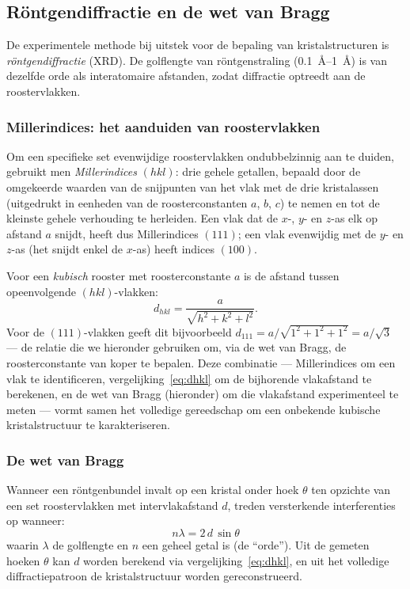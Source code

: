 \subsection{R\"ontgendiffractie en de wet van Bragg}
\label{sec:xrd}

De experimentele methode bij uitstek voor de bepaling van kristalstructuren is \emph{r\"ontgendiffractie} (XRD). De golflengte van r\"ontgenstraling (\SIrange{0.1}{1}{\angstrom}) is van dezelfde orde als interatomaire afstanden, zodat diffractie optreedt aan de roostervlakken.

\subsubsection{Millerindices: het aanduiden van roostervlakken}
\label{sec:miller}

Om een specifieke set evenwijdige roostervlakken ondubbelzinnig aan te duiden, gebruikt men \emph{Millerindices} $(hkl)$: drie gehele getallen, bepaald door de omgekeerde waarden van de snijpunten van het vlak met de drie kristalassen (uitgedrukt in eenheden van de roosterconstanten $a$, $b$, $c$) te nemen en tot de kleinste gehele verhouding te herleiden. Een vlak dat de $x$-, $y$- en $z$-as elk op afstand $a$ snijdt, heeft dus Millerindices $(111)$; een vlak evenwijdig met de $y$- en $z$-as (het snijdt enkel de $x$-as) heeft indices $(100)$.

Voor een \emph{kubisch} rooster met roosterconstante $a$ is de afstand tussen opeenvolgende $(hkl)$-vlakken:
\begin{equation}
\boxed{\;d_{hkl} = \frac{a}{\sqrt{h^2+k^2+l^2}}.\;}
\label{eq:dhkl}
\end{equation}
Voor de $(111)$-vlakken geeft dit bijvoorbeeld $d_{111}=a/\sqrt{1^2+1^2+1^2}=a/\sqrt3$ --- de relatie die we hieronder gebruiken om, via de wet van Bragg, de roosterconstante van koper te bepalen. Deze combinatie --- Millerindices om een vlak te identificeren, vergelijking~\eqref{eq:dhkl} om de bijhorende vlakafstand te berekenen, en de wet van Bragg (hieronder) om die vlakafstand experimenteel te meten --- vormt samen het volledige gereedschap om een onbekende kubische kristalstructuur te karakteriseren.

\subsubsection{De wet van Bragg}
\label{sec:bragg}

Wanneer een r\"ontgenbundel invalt op een kristal onder hoek $\theta$ ten opzichte van een set roostervlakken met intervlakafstand $d$, treden versterkende interferenties op wanneer:
\begin{equation}
\boxed{\;n\lambda = 2\,d\,\sin\theta\;}
\label{eq:bragg}
\end{equation}
waarin $\lambda$ de golflengte en $n$ een geheel getal is (de ``orde''). Uit de gemeten hoeken $\theta$ kan $d$ worden berekend via vergelijking~\eqref{eq:dhkl}, en uit het volledige diffractiepatroon de kristalstructuur worden gereconstrueerd.

